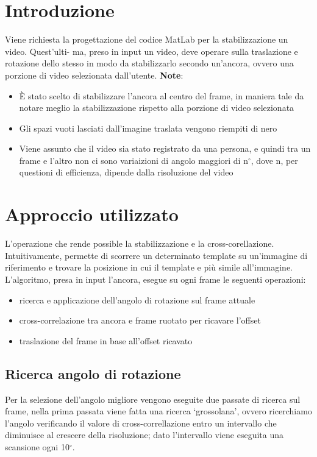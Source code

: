 \documentclass[12pt]{article}
\begin{document}
\section{Introduzione}
Viene richiesta la progettazione del codice MatLab per la stabilizzazione un video. Quest'ulti-
ma, preso in input un video, deve operare sulla traslazione e rotazione dello stesso in modo da
stabilizzarlo secondo un'ancora, ovvero una porzione di video selezionata dall'utente.
\textbf{Note}:
\begin{itemize}
\item È stato scelto di stabilizzare l'ancora al centro del frame, in maniera tale da notare meglio la stabilizzazione rispetto alla porzione di video selezionata
\item Gli spazi vuoti lasciati dall'imagine traslata vengono riempiti di nero
\item Viene assunto che il video sia stato registrato da una persona, e quindi tra un frame e l'altro non ci sono variaizioni di angolo maggiori di n$^{\circ}$, dove n, per questioni di efficienza, dipende dalla risoluzione del video
\end{itemize}

\clearpage
\section{Approccio utilizzato}
L'operazione che rende possible la stabilizzazione e la cross-corellazione. Intuitivamente, permette di scorrere un determinato template su un'immagine di riferimento e trovare la posizione in cui il template e più simile all'immagine.
L'algoritmo, presa in input l'ancora, esegue su ogni frame le seguenti operazioni:

\begin{itemize}
\item ricerca e applicazione dell'angolo di rotazione sul frame attuale
\item cross-correlazione tra ancora e frame ruotato per ricavare l'offset
\item traslazione del frame in base all'offset ricavato
\end{itemize}

\subsection{Ricerca angolo di rotazione}
Per la selezione dell'angolo migliore vengono eseguite due passate di ricerca sul frame, nella prima passata viene fatta una ricerca `grossolana', ovvero ricerchiamo l'angolo verificando il valore di cross-correllazione entro un intervallo che diminuisce al crescere della risoluzione; dato l'intervallo viene eseguita una scansione ogni 10$^{\circ}$.
\end{document}
